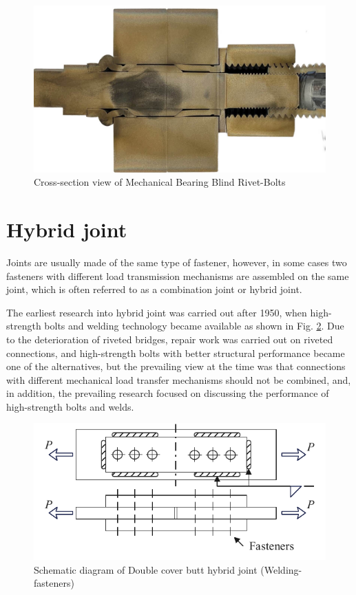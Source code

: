 \begin{figure}
    \centering
    \includegraphics[width=0.85\linewidth]{imgs//ch2/onesidebearingbolt.jpg}
    \caption{Cross-section view of Mechanical Bearing Blind Rivet-Bolts}
    \label{fig-MBBRB}
\end{figure}



\section{Hybrid joint}

Joints are usually made of the same type of fastener, however, in some cases two fasteners with different load transmission mechanisms are assembled on the same joint, which is often referred to as a combination joint or hybrid joint.

The earliest research into hybrid joint was carried out after 1950, when high-strength bolts and welding technology became available as shown in Fig. \ref{fig-schehyb}. Due to the deterioration of riveted bridges, repair work was carried out on riveted connections, and high-strength bolts with better structural performance became one of the alternatives, but the prevailing view at the time was that connections with different mechanical load transfer mechanisms should not be combined, and, in addition, the prevailing research focused on discussing the performance of high-strength bolts and welds.

\begin{figure}[ht]
    \centering
    \includegraphics[width=0.75\linewidth]{imgs//ch2/hybrid-sche.pdf}
    \caption{Schematic diagram of Double cover butt hybrid joint (Welding-fasteners)}
    \label{fig-schehyb}
\end{figure}

